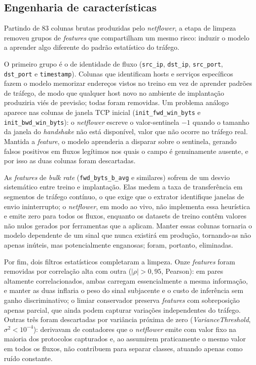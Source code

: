 \documentclass[12pt,a4paper]{article}
\begin{document}
\subsection{Engenharia de características}
\label{subsec:features}

Partindo de 83 colunas brutas produzidas pelo \textit{netflower}, a etapa de
limpeza removeu grupos de \textit{features} que compartilham um mesmo risco:
induzir o modelo a aprender algo diferente do padrão estatístico do tráfego.

O primeiro grupo é o de identidade de fluxo (\texttt{src\_ip},
\texttt{dst\_ip}, \texttt{src\_port}, \texttt{dst\_port} e
\texttt{timestamp}). Colunas que identificam hosts e serviços específicos fazem
o modelo memorizar endereços vistos no treino em vez de aprender padrões de
tráfego, de modo que qualquer host novo no ambiente de implantação produziria
viés de previsão; todas foram removidas. Um problema análogo aparece nas colunas
de janela TCP inicial (\texttt{init\_fwd\_win\_byts} e
\texttt{init\_bwd\_win\_byts}): o \textit{netflower} escreve o valor-sentinela
$-1$ quando o tamanho da janela do \textit{handshake} não está disponível, valor
que não ocorre no tráfego real. Mantida a \textit{feature}, o modelo aprenderia
a disparar sobre o sentinela, gerando falsos positivos em fluxos legítimos nos
quais o campo é genuinamente ausente, e por isso as duas colunas foram
descartadas.

As \textit{features} de \textit{bulk rate} (\texttt{fwd\_byts\_b\_avg} e
similares) sofrem de um desvio sistemático entre treino e implantação. Elas
medem a taxa de transferência em segmentos de tráfego contínuo, o que exige que
o extrator identifique janelas de envio ininterrupto; o \textit{netflower}, em
modo ao vivo, não implementa essa heurística e emite zero para todos os fluxos,
enquanto os datasets de treino contêm valores não nulos gerados por ferramentas
que a aplicam. Manter essas colunas tornaria o modelo dependente de um sinal que
nunca existirá em produção, tornando-as não apenas inúteis, mas potencialmente
enganosas; foram, portanto, eliminadas.

Por fim, dois filtros estatísticos completaram a limpeza. Onze
\textit{features} foram removidas por correlação alta com outra ($|\rho| >
0{,}95$, Pearson): em pares altamente correlacionados, ambas carregam
essencialmente a mesma informação, e manter as duas inflaria o peso do sinal
subjacente e o custo de inferência sem ganho discriminativo; o limiar
conservador preserva \textit{features} com sobreposição apenas parcial, que
ainda podem capturar variações independentes do tráfego. Outras três foram
descartadas por variância próxima de zero (\textit{VarianceThreshold},
$\sigma^2 < 10^{-4}$): derivavam de contadores que o \textit{netflower} emite
com valor fixo na maioria dos protocolos capturados e, ao assumirem praticamente
o mesmo valor em todos os fluxos, não contribuem para separar classes, atuando
apenas como ruído constante.
\end{document}
